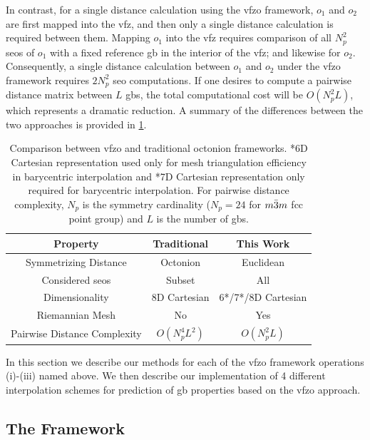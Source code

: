 \documentclass[preprint,12pt]{elsarticle}
\begin{document}
In contrast, for a single distance calculation using the \gls{vfzo} framework, $o_1$ and $o_2$ are first mapped into the \gls{vfz}, and then only a single distance calculation is required between them. Mapping $o_1$ into the \gls{vfz} requires comparison of all $N_p^2$ \glspl{seo} of $o_1$ with a fixed reference \gls{gb} in the interior of the \gls{vfz}; and likewise for $o_2$. Consequently, a single distance calculation between $o_1$ and $o_2$ under the \gls{vfzo} framework requires $2N_p^2$ \gls{seo} computations. If one desires to compute a pairwise distance matrix between $L$ \glspl{gb}, the total computational cost will be $O(N_p^2L)$, which represents a dramatic reduction. A summary of the differences between the two approaches is provided in \cref{tab:closed-mesh-comparison}.

\begin{table}
\caption{Comparison between \acrlong{vfzo} and traditional octonion frameworks. *6D Cartesian representation used only for mesh triangulation efficiency in barycentric interpolation and *7D Cartesian representation only required for barycentric interpolation. For pairwise distance complexity, $N_p$ is the symmetry cardinality ($N_p=24$ for $m\Bar{3}m$ \gls{fcc} point group) and $L$ is the number of \glspl{gb}.}
\centering
\begin{tabular}{ccc}
\toprule
Property & Traditional & This Work \\
\midrule
Symmetrizing Distance & Octonion & Euclidean \\
Considered \glspl{seo} & Subset & All \\
Dimensionality & 8D Cartesian & 6*/7*/8D Cartesian \\
Riemannian Mesh & No & Yes \\
Pairwise Distance Complexity & $O(N_p^4L^2)$ & $O(N_p^2L)$ \\
\bottomrule
\end{tabular}
\label{tab:closed-mesh-comparison}
\end{table}

In this section we describe our methods for each of the \gls{vfzo} framework operations (i)-(iii) named above. We then describe our implementation of 4 different interpolation schemes for prediction of \gls{gb} properties based on the \gls{vfzo} approach.

\subsection{The  Framework}
\label{sec:methods:framework}
\end{document}
